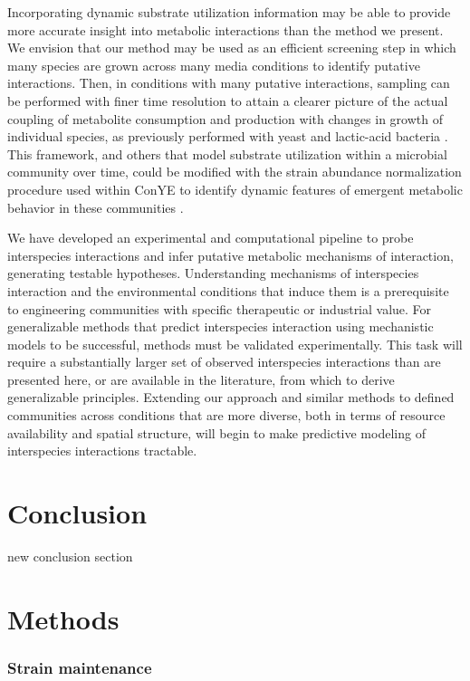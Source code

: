 \documentclass[11pt,twocolumn,notitlepage,openany,twoside]{book}
\begin{document}
\begin{refsection}
Incorporating dynamic substrate utilization information may be able to provide more accurate insight into metabolic interactions than the method we present. We envision that our method may be used as an efficient screening step in which many species are grown across many media conditions to identify putative interactions. Then, in conditions with many putative interactions, sampling can be performed with finer time resolution to attain a clearer picture of the actual coupling of metabolite consumption and production with changes in growth of individual species, as previously performed with yeast and lactic-acid bacteria \cite{Ponomarova2017-ob}. This framework, and others that model substrate utilization within a microbial community over time, could be modified with the strain abundance normalization procedure used within ConYE to identify dynamic features of emergent metabolic behavior in these communities \cite{Erbilgin2017-la}.

We have developed an experimental and computational pipeline to probe interspecies interactions and infer putative metabolic mechanisms of interaction, generating testable hypotheses.  Understanding mechanisms of interspecies interaction and the environmental conditions that induce them is a prerequisite to engineering communities with specific therapeutic or industrial value. For generalizable methods that predict interspecies interaction using mechanistic models to be successful, methods must be validated experimentally. This task will require a substantially larger set of observed interspecies interactions than are presented here, or are available in the literature, from which to derive generalizable principles. Extending our approach and similar methods to defined communities across conditions that are more diverse, both in terms of resource availability and spatial structure, will begin to make predictive modeling of interspecies interactions tractable.

\section{Conclusion}

new conclusion section

\section{Methods}
\subsubsection{Strain maintenance}


\end{refsection}
\end{document}
